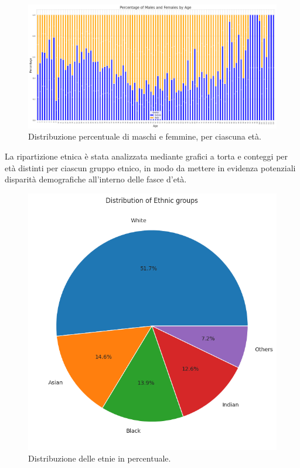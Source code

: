 \documentclass[a4paper,12pt]{report}
\begin{document}
	\begin{figure}[H]
		\centering
		\includegraphics[width=1.0\textwidth]{img/gender_byage_images.png}
		\caption{Distribuzione percentuale di maschi e femmine, per ciascuna età.}
	\end{figure} 
	
	La ripartizione etnica è stata analizzata mediante grafici a torta e conteggi per età distinti per ciascun gruppo etnico, in modo da mettere in evidenza potenziali disparità demografiche all'interno delle fasce d'età. \\
	
	\begin{figure}[H]
		\centering
		\includegraphics[width=1.0\textwidth]{img/pie_ethnic_image.png}
		\caption{Distribuzione delle etnie in percentuale.}
	\end{figure}
	
\end{document}
